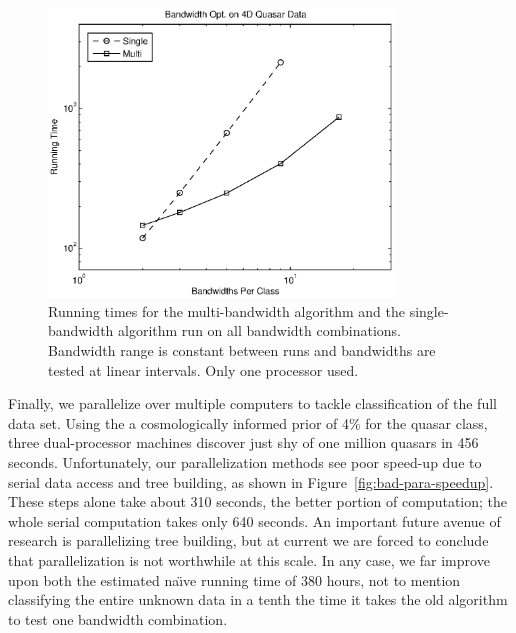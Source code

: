 \documentclass[twoside,leqno,twocolumn]{article}
\begin{document}
\begin{figure}[tb]
  \begin{center}
    \hspace*{-.3in}
    \includegraphics[width=3.6in]{multi_speed.eps}
    \hspace*{-.3in}
  \end{center}
  \vspace{-15pt}
  \caption{\label{fig:multi-speed}\footnotesize Running times for the
    multi-bandwidth algorithm and the single-bandwidth algorithm run
    on all bandwidth combinations.  Bandwidth range is constant
    between runs and bandwidths are tested at linear intervals.  Only
    one processor used.}
\end{figure}

Finally, we parallelize over multiple computers to tackle
classification of the full data set.  Using the a cosmologically
informed prior of 4\% for the quasar class, three dual-processor
machines discover just shy of one million quasars in 456 seconds.
Unfortunately, our parallelization methods see poor speed-up due to
serial data access and tree building, as shown in
Figure~\ref{fig:bad-para-speedup}.  These steps alone take about 310
seconds, the better portion of computation; the whole serial
computation takes only 640 seconds.  An important future avenue of
research is parallelizing tree building, but at current we are forced
to conclude that parallelization is not worthwhile at this scale.  In
any case, we far improve upon both the estimated na\"{\i}ve running
time of 380 hours, not to mention classifying the entire unknown data
in a tenth the time it takes the old algorithm to test one bandwidth
combination.
\end{document}
